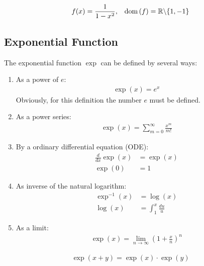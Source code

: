 \begin{ex} \begin{align*} f(x) & = \frac 1 {1-x^2}, & \operatorname{dom}\left( f\right) = \mathbb R \backslash\{1,-1\} \end{align*}
\end{ex}

\subsection{Exponential Function}
\begin{df}
The exponential function $\exp$ can be defined by several ways:
\begin{enumerate}
\item
As a power of $e$:
\begin{align*}
 \exp\left( x\right) = e^x
 \end{align*}
 Obviously, for this definition the number $e$ must be defined.
 \item
As a power series:
\begin{align*}
 \exp\left( x\right) = \sum_{m=0}^\infty \frac{x^m}{m!}
 \end{align*}
\item
By a ordinary differential equation (ODE):
\begin{align*}
 \frac{d}{dx} \exp\left( x\right) & = \exp\left( x\right) \\
 \exp\left( 0\right) & = 1
\end{align*}
\item
 As inverse of the natural logarithm:
\begin{align*}
 \exp^{-1}\left( x\right) & = \log\left( x\right) \\
 \log\left( x\right) & = \int_1^x \frac{du}{u}
\end{align*}
\item
As a limit:
\begin{align*}
\exp(x) = \lim_{n \to \infty} \left(1+ \frac x n \right)^n
\end{align*}
\end{enumerate}
\end{df}
\begin{pr}
\begin{align*}
\exp\left( x+y\right) = \exp\left( x\right) \cdot \exp\left( y\right)
\end{align*}
\end{pr} 

